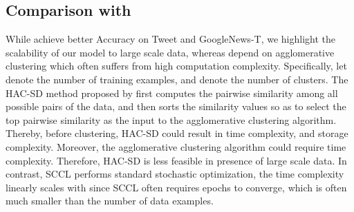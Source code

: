 \documentclass[11pt]{article}
\begin{document}
\subsection{Comparison with \citet{rakib2020enhancement}}
\label{appendix_rakib}
While \citet{rakib2020enhancement} achieve better Accuracy on Tweet and GoogleNews-T, we highlight the scalability of our model to large scale data, whereas \citet{rakib2020enhancement} depend on agglomerative clustering which often suffers from high computation complexity. Specifically, let  denote the number of training examples, and  denote the number of clusters. The HAC-SD method proposed by \citet{rakib2020enhancement} first computes the pairwise similarity among all possible pairs of the data, and then sorts the  similarity values so as to select the top  pairwise similarity as the input to the agglomerative clustering algorithm. Thereby, before clustering, HAC-SD could result in  time complexity, and   storage complexity. Moreover, the agglomerative clustering algorithm could require  time complexity. Therefore, HAC-SD is less feasible in presence of large scale data. In contrast, SCCL performs standard stochastic optimization, the time complexity linearly scales with  since SCCL often requires  epochs to converge, which is often much smaller than the number of data examples. 
\end{document}
